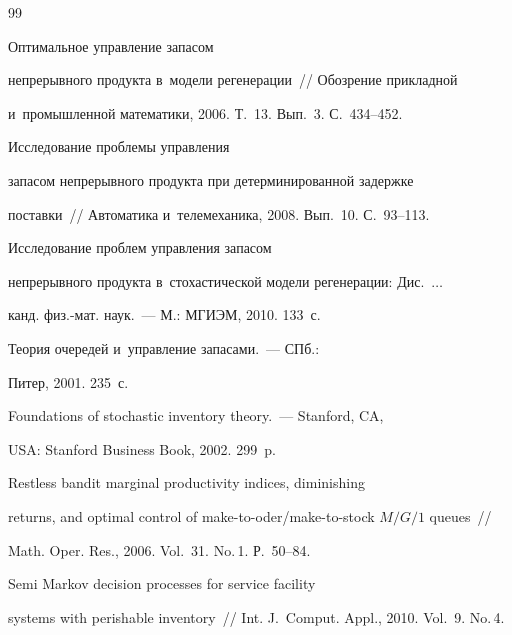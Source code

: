 {\small\frenchspacing

{%


\begin{thebibliography}{99}


 Оптимальное управление запасом 

непрерывного продукта в~модели регенерации~/\!\!/ Обозрение прикладной 

и~промышленной математики, 2006. Т.~13. Вып.~3. С.~434--452.


 Исследование проблемы управления 

запасом непрерывного продукта при детерминированной задержке 

поставки~/\!\!/ Автоматика и~телемеханика, 2008. Вып.~10. С.~93--113.


 Исследование проблем управления запасом 

непрерывного продукта в~стохастической модели регенерации: Дис.\ $\ldots$\ 

канд. физ.-мат. наук.~--- М.: МГИЭМ, 2010. 133~с.


 Теория очередей и~управление запасами.~--- СПб.: 

Питер, 2001. 235~с.


 Foundations of stochastic inventory theory.~--- Stanford, CA, 

USA: Stanford Business Book, 2002. 299~p.


 Restless bandit marginal productivity indices, diminishing 

returns, and optimal control of make-to-oder/make-to-stock $M/G/1$ queues~/\!\!/ 

Math. Oper. Res., 2006. Vol.~31. No.\,1. Р.~50--84.


Semi Markov decision processes for service facility 

systems with perishable inventory~/\!\!/ Int. J.~Comput. Appl., 2010. Vol.~9. No.\,4. 


\end{thebibliography}}}
